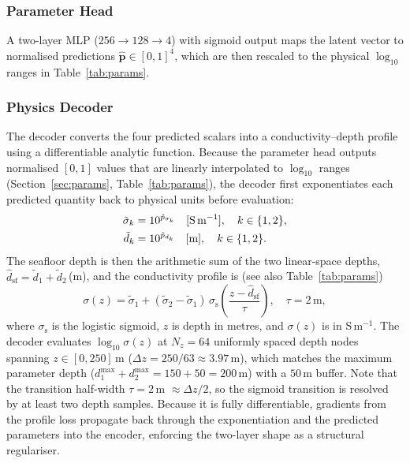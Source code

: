 \documentclass[journal]{IEEEtran}
\begin{document}
\subsubsection{Parameter Head}

A two-layer MLP ($256 \to 128 \to 4$) with sigmoid output maps the
latent vector to normalised predictions
$\hat{\mathbf{p}} \in [0,1]^4$, which are then rescaled to the
physical $\log_{10}$ ranges in Table~\ref{tab:params}.

\subsubsection{Physics Decoder}

The decoder converts the four predicted scalars into a
conductivity--depth profile using a differentiable analytic function.
Because the parameter head outputs normalised $[0,1]$ values that are
linearly interpolated to $\log_{10}$ ranges (Section~\ref{sec:params},
Table~\ref{tab:params}), the decoder first exponentiates each
predicted quantity back to physical units before evaluation:
\begin{align}
  \tilde{\sigma}_k &= 10^{\hat{p}_{\sigma_k}}
      \quad [{\rm S\,m^{-1}}], \quad k \in \{1, 2\}, \\
  \tilde{d}_k      &= 10^{\hat{p}_{d_k}}
      \quad [{\rm m}],           \quad k \in \{1, 2\}.
  \label{eq:decode_units}
\end{align}
The seafloor depth is then the arithmetic sum of the two linear-space
depths, $\hat{d}_\mathrm{sf} = \tilde{d}_1 + \tilde{d}_2$\,(m), and
the conductivity profile is (see also Table~\ref{tab:params})
\begin{equation}
  \sigma(z) = \tilde{\sigma}_1
    + (\tilde{\sigma}_2 - \tilde{\sigma}_1)\,
    \sigma_\mathrm{s}\!\left(
      \frac{z - \hat{d}_\mathrm{sf}}{\tau}
    \right),
  \quad \tau = 2\,\mathrm{m},
  \label{eq:profile}
\end{equation}
where $\sigma_\mathrm{s}$ is the logistic sigmoid, $z$ is depth in
metres, and $\sigma(z)$ is in S\,m$^{-1}$. The decoder evaluates
$\log_{10}\sigma(z)$ at $N_z = 64$ uniformly spaced depth nodes
spanning $z \in [0, 250]$\,m ($\Delta z = 250/63 \approx 3.97$\,m),
which matches the maximum parameter depth ($d_1^{\max}+d_2^{\max} =
150+50 = 200$\,m) with a $50$\,m buffer. Note that the transition
half-width $\tau = 2$\,m $\approx \Delta z/2$, so the sigmoid
transition is resolved by at least two depth samples. Because it is
fully differentiable, gradients from the profile loss propagate back
through the exponentiation and the predicted parameters into the
encoder, enforcing the two-layer shape as a structural regulariser.
\end{document}
